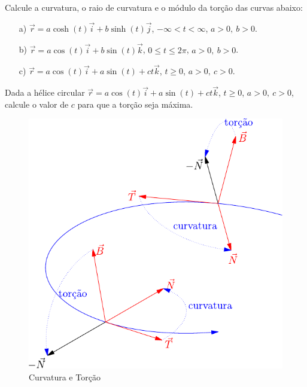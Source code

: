 \begin{exer} Calcule a curvatura, o raio de curvatura e o módulo da torção das curvas abaixo:
\begin{itemize}
\item[a)] $\vec{r}=a\cosh(t)\vec{i}+b\sinh(t)\vec{j}$, $-\infty<t<\infty$, $a>0,\ b>0$.
\item[b)] $\vec{r}=a\cos(t)\vec{i}+b\sin(t)\vec{k}$, $0\leq t\leq 2\pi$, $a>0,\ b>0$.
\item[c)] $\vec{r}=a\cos(t)\vec{i}+a\sin(t)+ct\vec{k}$, $t\geq 0$, $a>0,\ c>0$.

\end{itemize}
\end{exer}
 
 \begin{exer}{\label{prob_torcao}} Dada a hélice circular $\vec{r}=a\cos(t)\vec{i}+a\sin(t)+ct\vec{k}$, $t\geq 0$, $a>0,\ c>0$, calcule o valor de $c$ para que a torção seja máxima.
 \end{exer}


 
 \begin{figure}
\begin{center}
    \includegraphics{./cap_curvas/figs/curvatura_torcao}
 \caption{Curvatura e Torção}\label{Curvatura_torcao_1}
  \end{center}
\end{figure}


